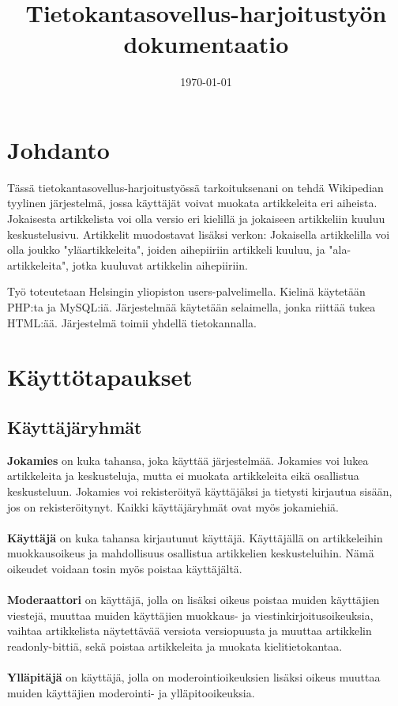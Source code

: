 \documentclass[12pt]{article}
\title{Tietokantasovellus-harjoitustyön dokumentaatio}
\date{\today}
\begin{document}
  \maketitle
  \newpage
  \tableofcontents
  \newpage

  \section{Johdanto}
    Tässä tietokantasovellus-harjoitustyössä tarkoituksenani on tehdä Wikipedian tyylinen järjestelmä, jossa käyttäjät voivat muokata artikkeleita eri aiheista. Jokaisesta artikkelista voi olla versio eri kielillä ja jokaiseen artikkeliin kuuluu keskustelusivu. Artikkelit muodostavat lisäksi verkon: Jokaisella artikkelilla voi olla joukko "yläartikkeleita", joiden aihepiiriin artikkeli kuuluu, ja "ala-artikkeleita", jotka kuuluvat artikkelin aihepiiriin.

    Työ toteutetaan Helsingin yliopiston users-palvelimella. Kielinä käytetään PHP:ta ja MySQL:iä. Järjestelmää käytetään selaimella, jonka riittää tukea HTML:ää. Järjestelmä toimii yhdellä tietokannalla.
  \newpage

  \section{Käyttötapaukset}
    \subsection{Käyttäjäryhmät}
      \textbf{Jokamies} on kuka tahansa, joka käyttää järjestelmää. Jokamies voi lukea artikkeleita ja keskusteluja, mutta ei muokata artikkeleita eikä osallistua keskusteluun. Jokamies voi rekisteröityä käyttäjäksi ja tietysti kirjautua sisään, jos on rekisteröitynyt. Kaikki käyttäjäryhmät ovat myös jokamiehiä.\\ \\
      \textbf{Käyttäjä} on kuka tahansa kirjautunut käyttäjä. Käyttäjällä on artikkeleihin muokkausoikeus ja mahdollisuus osallistua artikkelien keskusteluihin. Nämä oikeudet voidaan tosin myös poistaa käyttäjältä. \\ \\
      \textbf{Moderaattori} on käyttäjä, jolla on lisäksi oikeus poistaa muiden käyttäjien viestejä, muuttaa muiden käyttäjien muokkaus- ja viestinkirjoitusoikeuksia, vaihtaa artikkelista näytettävää versiota versiopuusta ja muuttaa artikkelin readonly-bittiä, sekä poistaa artikkeleita ja muokata kielitietokantaa. \\ \\
      \textbf{Ylläpitäjä} on käyttäjä, jolla on moderointioikeuksien lisäksi oikeus muuttaa muiden käyttäjien moderointi- ja ylläpitooikeuksia.
\end{document}
